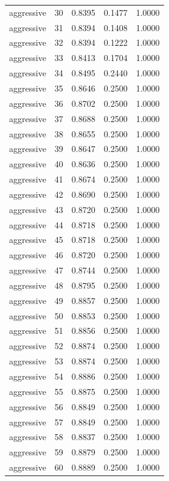 \begin{tabular}{lrrrr}
aggressive & 30 & 0.8395 & 0.1477 & 1.0000 \\
aggressive & 31 & 0.8394 & 0.1408 & 1.0000 \\
aggressive & 32 & 0.8394 & 0.1222 & 1.0000 \\
aggressive & 33 & 0.8413 & 0.1704 & 1.0000 \\
aggressive & 34 & 0.8495 & 0.2440 & 1.0000 \\
aggressive & 35 & 0.8646 & 0.2500 & 1.0000 \\
aggressive & 36 & 0.8702 & 0.2500 & 1.0000 \\
aggressive & 37 & 0.8688 & 0.2500 & 1.0000 \\
aggressive & 38 & 0.8655 & 0.2500 & 1.0000 \\
aggressive & 39 & 0.8647 & 0.2500 & 1.0000 \\
aggressive & 40 & 0.8636 & 0.2500 & 1.0000 \\
aggressive & 41 & 0.8674 & 0.2500 & 1.0000 \\
aggressive & 42 & 0.8690 & 0.2500 & 1.0000 \\
aggressive & 43 & 0.8720 & 0.2500 & 1.0000 \\
aggressive & 44 & 0.8718 & 0.2500 & 1.0000 \\
aggressive & 45 & 0.8718 & 0.2500 & 1.0000 \\
aggressive & 46 & 0.8720 & 0.2500 & 1.0000 \\
aggressive & 47 & 0.8744 & 0.2500 & 1.0000 \\
aggressive & 48 & 0.8795 & 0.2500 & 1.0000 \\
aggressive & 49 & 0.8857 & 0.2500 & 1.0000 \\
aggressive & 50 & 0.8853 & 0.2500 & 1.0000 \\
aggressive & 51 & 0.8856 & 0.2500 & 1.0000 \\
aggressive & 52 & 0.8874 & 0.2500 & 1.0000 \\
aggressive & 53 & 0.8874 & 0.2500 & 1.0000 \\
aggressive & 54 & 0.8886 & 0.2500 & 1.0000 \\
aggressive & 55 & 0.8875 & 0.2500 & 1.0000 \\
aggressive & 56 & 0.8849 & 0.2500 & 1.0000 \\
aggressive & 57 & 0.8849 & 0.2500 & 1.0000 \\
aggressive & 58 & 0.8837 & 0.2500 & 1.0000 \\
aggressive & 59 & 0.8879 & 0.2500 & 1.0000 \\
aggressive & 60 & 0.8889 & 0.2500 & 1.0000 \\

\end{tabular}
